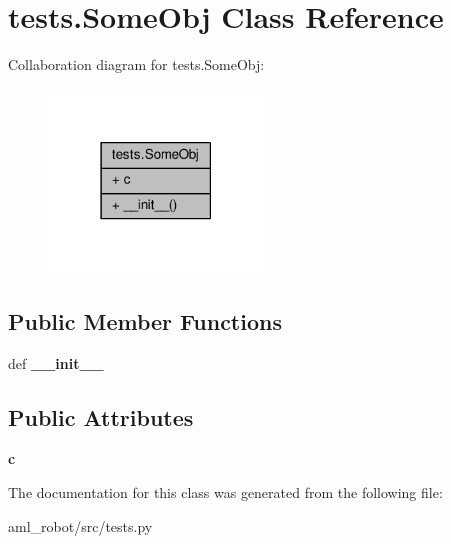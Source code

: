 \hypertarget{classtests_1_1_some_obj}{\section{tests.\-Some\-Obj Class Reference}
\label{classtests_1_1_some_obj}
}


Collaboration diagram for tests.\-Some\-Obj\-:
\nopagebreak
\begin{figure}[H]
\begin{center}
\leavevmode
\includegraphics[width=162pt]{classtests_1_1_some_obj__coll__graph}
\end{center}
\end{figure}
\subsection*{Public Member Functions}
\begin{DoxyCompactItemize}
\item 
\hypertarget{classtests_1_1_some_obj_ae4cab4310d5313ab6b73d9d8ac0a8393}{def {\bfseries \-\_\-\-\_\-init\-\_\-\-\_\-}}\label{classtests_1_1_some_obj_ae4cab4310d5313ab6b73d9d8ac0a8393}

\end{DoxyCompactItemize}
\subsection*{Public Attributes}
\begin{DoxyCompactItemize}
\item 
\hypertarget{classtests_1_1_some_obj_ad442c35720f3dd0172c277d3bb4e9316}{{\bfseries c}}\label{classtests_1_1_some_obj_ad442c35720f3dd0172c277d3bb4e9316}

\end{DoxyCompactItemize}


The documentation for this class was generated from the following file\-:\begin{DoxyCompactItemize}
\item 
aml\-\_\-robot/src/tests.\-py\end{DoxyCompactItemize}
